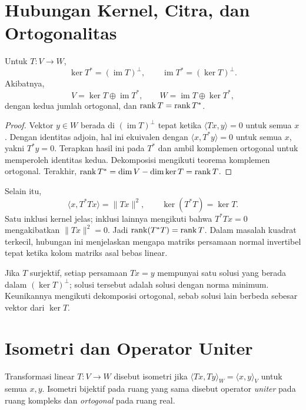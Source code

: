 \section{Hubungan Kernel, Citra, dan Ortogonalitas}

\begin{teorema}
    Untuk $T:V\to W$,
    \[
        \ker T^*=(\operatorname{im}T)^\perp,\qquad
        \operatorname{im}T^*=(\ker T)^\perp.
    \]
    Akibatnya,
    \[
        V=\ker T\oplus\operatorname{im}T^*,\qquad
        W=\operatorname{im}T\oplus\ker T^*,
    \]
    dengan kedua jumlah ortogonal, dan $\operatorname{rank} T=\operatorname{rank} T^*$.
\end{teorema}
\begin{proof}
    Vektor $y\in W$ berada di $(\operatorname{im}T)^\perp$
    tepat ketika $\langle Tx,y\rangle=0$ untuk semua $x$.
    Dengan identitas adjoin, hal ini ekuivalen dengan
    $\langle x,T^*y\rangle=0$ untuk semua $x$, yakni $T^*y=0$.
    Terapkan hasil ini pada $T^*$ dan ambil komplemen ortogonal
    untuk memperoleh identitas kedua.
    Dekomposisi mengikuti teorema komplemen ortogonal.
    Terakhir, $\operatorname{rank} T^*=\dim V-\dim\ker T=\operatorname{rank} T$.
\end{proof}

Selain itu,
\[
    \langle x,T^*Tx\rangle=\|Tx\|^2,
    \qquad \ker(T^*T)=\ker T.
\]
Satu inklusi kernel jelas; inklusi lainnya mengikuti bahwa
$T^*Tx=0$ mengakibatkan $\|Tx\|^2=0$.
Jadi $\operatorname{rank}(T^*T)=\operatorname{rank} T$.
Dalam masalah kuadrat terkecil, hubungan ini menjelaskan mengapa
matriks persamaan normal invertibel tepat ketika kolom matriks
asal bebas linear.

Jika $T$ surjektif, setiap persamaan $Tx=y$ mempunyai satu
solusi yang berada dalam $(\ker T)^\perp$; solusi tersebut
adalah solusi dengan norma minimum. Keunikannya mengikuti
dekomposisi ortogonal, sebab solusi lain berbeda sebesar
vektor dari $\ker T$.

\section{Isometri dan Operator Uniter}

\begin{definisi}
    Transformasi linear $T:V\to W$ disebut isometri jika
    $\langle Tx,Ty\rangle_W=\langle x,y\rangle_V$ untuk semua $x,y$.
    Isometri bijektif pada ruang yang sama disebut operator
    \emph{uniter} pada ruang kompleks dan \emph{ortogonal} pada ruang real.
\end{definisi}

